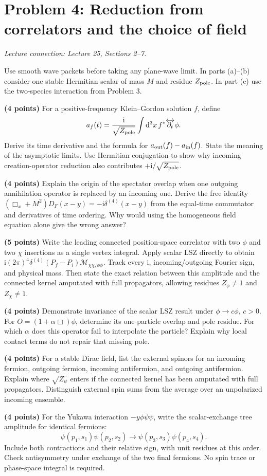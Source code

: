 \documentclass[11pt]{article}
\newcommand{\dd}{\mathrm d}
\newcommand{\ii}{\mathrm i}
\newcommand{\cM}{\mathcal M}
\newcommand{\Zp}{Z_{\rm pole}}
\newcommand{\problem}[2]{\clearpage\section*{\color{qftblue}Problem #1: #2}}
\newcommand{\connection}[1]{{\small\textit{Lecture connection: #1}\par}\medskip}
\begin{document}
\problem{4}{Reduction from correlators and the choice of field}
\connection{Lecture 25, Sections 2--7.}
Use smooth wave packets before taking any plane-wave limit. In parts
(a)--(b) consider one stable Hermitian scalar of mass \(M\) and residue
\(\Zp\). In part (c) use the two-species interaction from Problem 3.
\begin{parts}
\item \textbf{(4 points)} For a positive-frequency Klein--Gordon solution
\(f\), define
\[
 a_f(t)=\frac{\ii}{\sqrt{\Zp}}\int\dd^3x\,
 f^*\overleftrightarrow{\partial_t}\phi.
\]
Derive its time derivative and the formula for
\(a_{\rm out}(f)-a_{\rm in}(f)\). State the meaning of the asymptotic
limits. Use Hermitian conjugation to show why incoming creation-operator
reduction also contributes \(+\ii/\sqrt{\Zp}\).

\item \textbf{(4 points)} Explain the origin of the spectator overlap
when one outgoing annihilation operator is replaced by an incoming one.
Derive the free identity \((\Box_x+M^2)D_F(x-y)=-\ii\delta^{(4)}(x-y)\)
from the equal-time commutator and derivatives of time ordering. Why would
using the homogeneous field equation alone give the wrong answer?

\item \textbf{(5 points)} Write the leading connected position-space
correlator with two \(\phi\) and two \(\chi\) insertions as a single vertex
integral. Apply scalar LSZ directly to obtain
\(\ii(2\pi)^4\delta^{(4)}(P_f-P_i)\cM_{\chi\chi,\phi\phi}\).
Track every \(\ii\), incoming/outgoing Fourier sign, and physical mass.
Then state the exact relation between this amplitude and the connected
kernel amputated with full propagators, allowing residues
\(Z_\phi\ne1\) and \(Z_\chi\ne1\).

\item \textbf{(4 points)} Demonstrate invariance of the scalar LSZ result
under \(\phi\to c\phi\), \(c>0\). For
\(O=(1+\alpha\Box)\phi\), determine its one-particle overlap and pole
residue. For which \(\alpha\) does this operator fail to interpolate the
particle? Explain why local contact terms do not repair that missing pole.

\item \textbf{(4 points)} For a stable Dirac field, list the external
spinors for an incoming fermion, outgoing fermion, incoming antifermion,
and outgoing antifermion. Explain where \(\sqrt{Z_\psi}\) enters if the
connected kernel has been amputated with full propagators. Distinguish
external spin sums from the average over an unpolarized incoming ensemble.

\item \textbf{(4 points)} For the Yukawa interaction \(-y\phi\bar\psi\psi\),
write the scalar-exchange tree amplitude for identical fermions:
\[
 \psi(p_1,s_1)\psi(p_2,s_2)\to\psi(p_3,s_3)\psi(p_4,s_4).
\] Include both contractions and their relative sign,
with unit residues at this order. Check antisymmetry under exchange of the
two final fermions. No spin trace or phase-space integral is required.
\end{parts}
\end{document}
